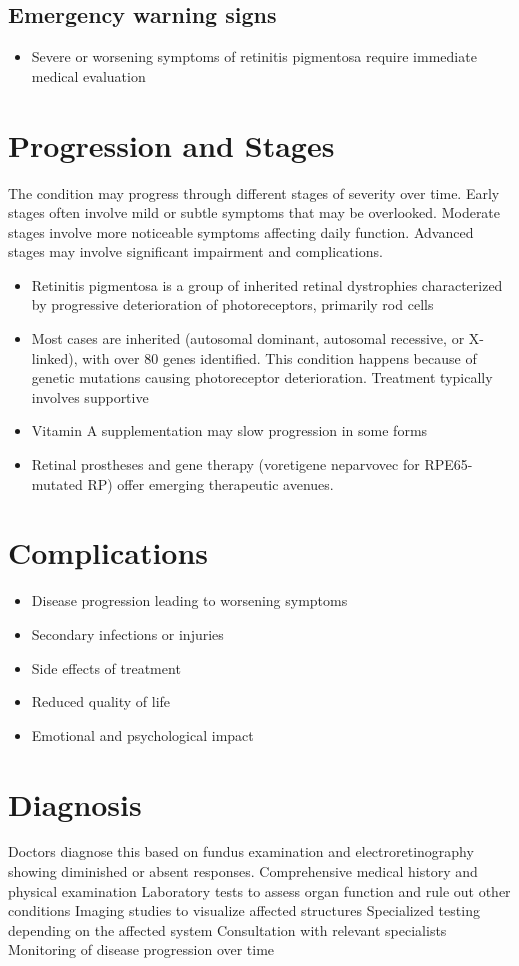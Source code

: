 \subsection{Emergency warning signs}
\begin{itemize}[noitemsep]
  \item Severe or worsening symptoms of retinitis pigmentosa require immediate medical evaluation
\end{itemize}
\section{Progression and Stages}
The condition may progress through different stages of severity over time. Early stages often involve mild or subtle symptoms that may be overlooked. Moderate stages involve more noticeable symptoms affecting daily function. Advanced stages may involve significant impairment and complications.

\begin{itemize}[noitemsep]
  \item Retinitis pigmentosa is a group of inherited retinal dystrophies characterized by progressive deterioration of photoreceptors, primarily rod cells
  \item Most cases are inherited (autosomal dominant, autosomal recessive, or X-linked), with over 80 genes identified. This condition happens because of genetic mutations causing photoreceptor deterioration. Treatment typically involves supportive
  \item Vitamin A supplementation may slow progression in some forms
  \item Retinal prostheses and gene therapy (voretigene neparvovec for RPE65-mutated RP) offer emerging therapeutic avenues.
\end{itemize}
\section{Complications}
\begin{itemize}[noitemsep]
  \item Disease progression leading to worsening symptoms
  \item Secondary infections or injuries
  \item Side effects of treatment
  \item Reduced quality of life
  \item Emotional and psychological impact
\end{itemize}
\section{Diagnosis}
Doctors diagnose this based on fundus examination and electroretinography showing diminished or absent responses. Comprehensive medical history and physical examination Laboratory tests to assess organ function and rule out other conditions Imaging studies to visualize affected structures Specialized testing depending on the affected system Consultation with relevant specialists Monitoring of disease progression over time

